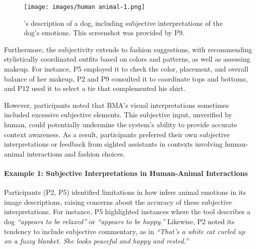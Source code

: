 \begin{figure}[t!]
\centering
\texttt{[image: images/human animal-1.png]}
\caption{\bma's description of a dog, including subjective interpretations of the dog's emotions. This screenshot was provided by P9.}
\label{human_animal}
\end{figure}
Furthermore, the subjectivity extends to fashion suggestions, with \bma{} recommending stylistically coordinated outfits based on colors and patterns, as well as assessing makeup. 
For instance, P5 employed it to check the color, placement, and overall balance of her makeup, P2 and P9 consulted it to coordinate tops and bottoms, and P12 used it to select a tie that complemented his shirt. 


However, participants noted that BMA's visual interpretations sometimes included excessive subjective elements. 
This subjective input, unverified by human, could potentially undermine the system's ability to provide accurate context awareness.  
As a result, participants preferred their own subjective interpretations or feedback from sighted assistants in contexts involving human-animal interactions and fashion choices. 




\paragraph{Example 1: Subjective Interpretations in Human-Animal Interactions}


Participants (P2, P5) identified limitations in how \sbma{} infers animal emotions in its image descriptions, raising concerns about the accuracy of these subjective interpretations. 
For instance, P5 highlighted instances where the tool describes a dog \textit{``appears to be relaxed''} or \textit{``appears to be happy.''} 
Likewise, P2 noted its tendency to include subjective commentary, as in \textit{``That's a white cat curled up on a fuzzy blanket. She looks peaceful and happy and rested.''} 



